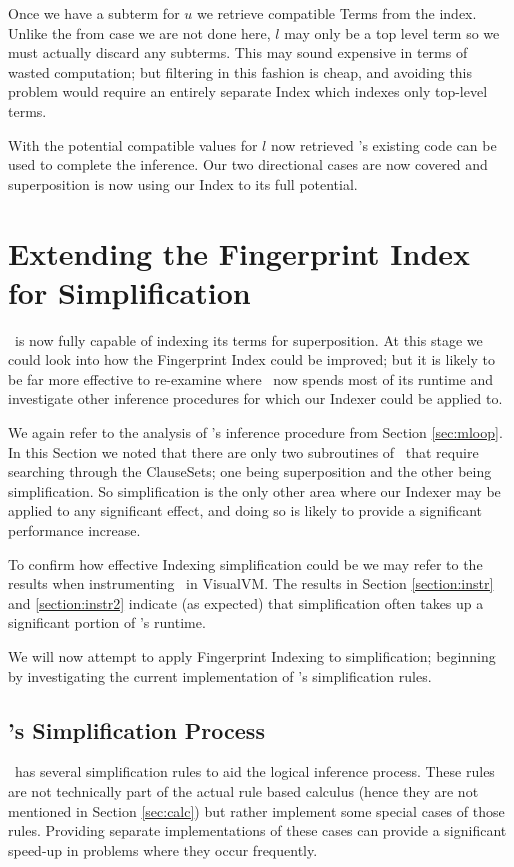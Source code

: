 Once we have a subterm for $u$ we retrieve compatible Terms from the index.
Unlike the from case we are not done here, $l$ may only be a top level term
so we must actually discard any subterms. This may sound expensive in terms
of wasted computation; but filtering in this fashion is cheap, and avoiding this
problem would require an entirely separate Index which indexes only top-level terms.
 
With the potential compatible values for $l$ now retrieved \beagle's existing code
can be used to complete the inference. Our two directional cases are now
covered and superposition is now using our Index to its full potential.

\section{Extending the Fingerprint Index for Simplification}
\label{sec:simp}

\Beagle\ is now fully capable of indexing its terms for superposition. At this stage
we could look into how the Fingerprint Index could be improved; but it is likely
to be far more effective to re-examine where \beagle\ now spends most of its runtime
and investigate other inference procedures for which our Indexer could be applied to. 

We again refer to the analysis of \beagle's inference procedure from Section \ref{sec:mloop}.
In this Section we noted that there are only two subroutines of \beagle\ that require
searching through the ClauseSets; one being superposition and the other being simplification.
So simplification is the only other area where our Indexer may be applied to
any significant effect, and doing so is likely to provide a significant performance
increase.

To confirm how effective Indexing simplification could be we may refer to the results when
instrumenting \beagle\ in VisualVM. The results in Section \ref{section:instr} and \ref{section:instr2}
indicate (as expected) that simplification often takes up a significant portion
of \beagle's runtime.

We will now attempt to apply Fingerprint Indexing to simplification; beginning
by investigating the current implementation of \beagle's simplification rules. 

\subsection{\Beagle's Simplification Process}
\label{sec:simprules}
\Beagle\ has several simplification rules to aid the logical inference process.
These rules are not technically part of the actual rule based calculus
(hence they are not mentioned in Section \ref{sec:calc}) but rather
implement some special cases of those rules. Providing separate implementations
of these cases can provide a significant speed-up in problems where they occur
frequently.

